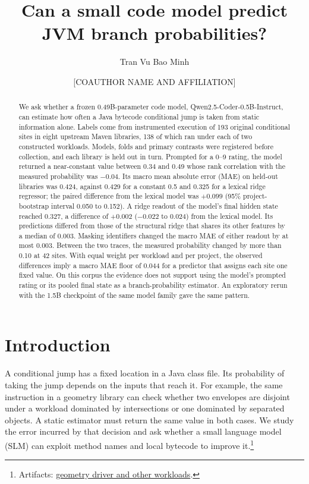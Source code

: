 \documentclass[11pt]{article}
\title{Can a small code model predict JVM branch probabilities?}
\author{Tran Vu Bao Minh \and [COAUTHOR NAME AND AFFILIATION]}
\date{}
\newcommand{\repocommit}{81d03caebe268d013b3163bcbff31cadabaaec21}
\newcommand{\repourl}{https://github.com/minggu151623/llm_profiling_research}
\newcommand{\repo}[2]{\href{\repourl/blob/\repocommit/#1}{#2}}
\newcommand{\artifacts}[1]{\footnote{Artifacts: #1.}}
\begin{document}
\maketitle

\begin{abstract}
We ask whether a frozen 0.49B-parameter code model, Qwen2.5-Coder-0.5B-Instruct, can estimate how often a Java bytecode conditional jump is taken from static information alone. Labels come from instrumented execution of 193 original conditional sites in eight upstream Maven libraries, 138 of which ran under each of two constructed workloads. Models, folds and primary contrasts were registered before collection, and each library is held out in turn. Prompted for a 0--9 rating, the model returned a near-constant value between 0.34 and 0.49 whose rank correlation with the measured probability was $-0.04$. Its macro mean absolute error (MAE) on held-out libraries was 0.424, against 0.429 for a constant 0.5 and 0.325 for a lexical ridge regressor; the paired difference from the lexical model was $+0.099$ (95\% project-bootstrap interval 0.050 to 0.152). A ridge readout of the model's final hidden state reached 0.327, a difference of $+0.002$ ($-0.022$ to 0.024) from the lexical model. Its predictions differed from those of the structural ridge that shares its other features by a median of 0.003. Masking identifiers changed the macro MAE of either readout by at most 0.003. Between the two traces, the measured probability changed by more than 0.10 at 42 sites. With equal weight per workload and per project, the observed differences imply a macro MAE floor of 0.044 for a predictor that assigns each site one fixed value. On this corpus the evidence does not support using the model's prompted rating or its pooled final state as a branch-probability estimator. An exploratory rerun with the 1.5B checkpoint of the same model family gave the same pattern.
\end{abstract}

\section{Introduction}

A conditional jump has a fixed location in a Java class file. Its probability of taking the jump depends on the inputs that reach it. For example, the same instruction in a geometry library can check whether two envelopes are disjoint under a workload dominated by intersections or one dominated by separated objects. A static estimator must return the same value in both cases. We study the error incurred by that decision and ask whether a small language model (SLM) can exploit method names and local bytecode to improve it.\artifacts{\repo{java/corpus/Workloads.java}{geometry driver and other workloads}}
\end{document}
